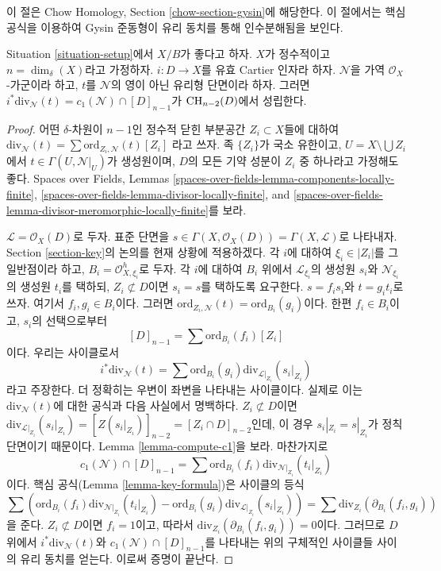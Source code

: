 \noindent
이 절은 Chow Homology, Section \ref{chow-section-gysin}에 해당한다.
이 절에서는 핵심 공식을 이용하여 Gysin 준동형이
유리 동치를 통해 인수분해됨을 보인다.

\begin{lemma}
\label{lemma-gysin-factors-general}
Situation \ref{situation-setup}에서 $X/B$가 좋다고 하자.
$X$가 정수적이고 $n = \dim_\delta(X)$라고 가정하자.
$i : D \to X$를 유효 Cartier 인자라 하자.
$\mathcal{N}$을 가역 $\mathcal{O}_X$-가군이라 하고,
$t$를 $\mathcal{N}$의 영이 아닌 유리형 단면이라 하자. 그러면
$i^*\text{div}_\mathcal{N}(t) = c_1(\mathcal{N}) \cap [D]_{n - 1}$가
$\mathop{\mathrm{CH}}\nolimits_{n - 2}(D)$에서 성립한다.
\end{lemma}

\begin{proof}
어떤 $\delta$-차원이 $n - 1$인 정수적 닫힌 부분공간
$Z_i \subset X$들에 대하여
$\text{div}_\mathcal{N}(t) = \sum \text{ord}_{Z_i, \mathcal{N}}(t)[Z_i]$
라고 쓰자. 족 $\{Z_i\}$가 국소 유한이고,
$U = X \setminus \bigcup Z_i$에서
$t \in \Gamma(U, \mathcal{N}|_U)$가 생성원이며, $D$의 모든 기약 성분이
$Z_i$ 중 하나라고 가정해도 좋다. Spaces over Fields, Lemmas
\ref{spaces-over-fields-lemma-components-locally-finite},
\ref{spaces-over-fields-lemma-divisor-locally-finite}, and
\ref{spaces-over-fields-lemma-divisor-meromorphic-locally-finite}를 보라.

\medskip\noindent
$\mathcal{L} = \mathcal{O}_X(D)$로 두자. 표준 단면을
$s \in \Gamma(X, \mathcal{O}_X(D)) = \Gamma(X, \mathcal{L})$로 나타내자.
Section \ref{section-key}의 논의를 현재 상황에 적용하겠다.
각 $i$에 대하여 $\xi_i \in |Z_i|$를 그 일반점이라 하고,
$B_i = \mathcal{O}_{X, \xi_i}^h$로 두자. 각 $i$에 대하여
$B_i$ 위에서 $\mathcal{L}_{\xi_i}$의 생성원 $s_i$와
$\mathcal{N}_{\xi_i}$의 생성원 $t_i$를 택하되,
$Z_i \not \subset D$이면 $s_i = s$를 택하도록 요구한다.
$s = f_i s_i$와 $t = g_i t_i$로 쓰자. 여기서 $f_i, g_i \in B_i$이다.
그러면 $\text{ord}_{Z_i, \mathcal{N}}(t) = \text{ord}_{B_i}(g_i)$이다.
한편 $f_i \in B_i$이고, $s_i$의 선택으로부터
$$
[D]_{n - 1} = \sum \text{ord}_{B_i}(f_i)[Z_i]
$$
이다. 우리는 사이클로서
$$
i^*\text{div}_\mathcal{N}(t) =
\sum \text{ord}_{B_i}(g_i) \text{div}_{\mathcal{L}|_{Z_i}}(s_i|_{Z_i})
$$
라고 주장한다. 더 정확히는 우변이 좌변을 나타내는 사이클이다.
실제로 이는 $\text{div}_\mathcal{N}(t)$에 대한 공식과 다음 사실에서
명백하다. $Z_i \not \subset D$이면
$\text{div}_{\mathcal{L}|_{Z_i}}(s_i|_{Z_i}) = [Z(s_i|_{Z_i})]_{n - 2} =
[Z_i \cap D]_{n - 2}$인데, 이 경우
$s_i|_{Z_i} = s|_{Z_i}$가 정칙 단면이기 때문이다. Lemma
\ref{lemma-compute-c1}을 보라. 마찬가지로
$$
c_1(\mathcal{N}) \cap [D]_{n - 1} =
\sum \text{ord}_{B_i}(f_i) \text{div}_{\mathcal{N}|_{Z_i}}(t_i|_{Z_i})
$$
이다. 핵심 공식(Lemma \ref{lemma-key-formula})은 사이클의 등식
$$
\sum \left(
\text{ord}_{B_i}(f_i) \text{div}_{\mathcal{N}|_{Z_i}}(t_i|_{Z_i}) -
\text{ord}_{B_i}(g_i) \text{div}_{\mathcal{L}|_{Z_i}}(s_i|_{Z_i}) \right) =
\sum \text{div}_{Z_i}(\partial_{B_i}(f_i, g_i))
$$
을 준다. $Z_i \not \subset D$이면 $f_i = 1$이고, 따라서
$\text{div}_{Z_i}(\partial_{B_i}(f_i, g_i)) = 0$이다.
그러므로 $D$ 위에서 $i^*\text{div}_\mathcal{N}(t)$와
$c_1(\mathcal{N}) \cap [D]_{n - 1}$를 나타내는 위의 구체적인
사이클들 사이의 유리 동치를 얻는다. 이로써 증명이 끝난다.
\end{proof}

